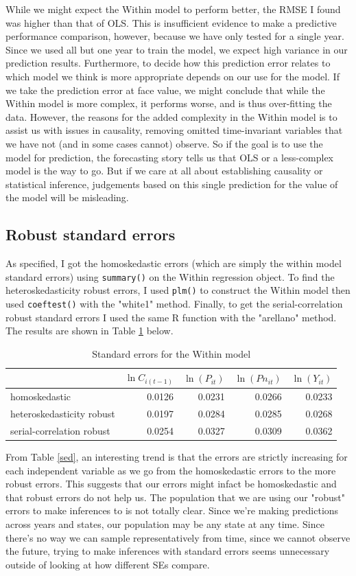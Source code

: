 \documentclass{article}
\begin{document}
While we might expect the Within model to perform better, the RMSE I found was higher than that of OLS. This is insufficient evidence to make a predictive performance comparison, however, because we have only tested for a single year. Since we used all but one year to train the model, we expect high variance in our prediction results. Furthermore, to decide how this prediction error relates to which model we think is more appropriate depends on our use for the model. If we take the prediction error at face value, we might conclude that while the Within model is more complex, it performs worse, and is thus over-fitting the data. However, the reasons for the added complexity in the Within model is to assist us with issues in causality, removing omitted time-invariant variables that we have not (and in some cases cannot) observe. So if the goal is to use the model for prediction, the forecasting story tells us that OLS or a less-complex model is the way to go. But if we care at all about establishing causality or statistical inference, judgements based on this single prediction for the value of the model will be misleading.

\subsection{Robust standard errors}
As specified, I got the homoskedastic errors (which are simply the within model standard errors) using \verb|summary()| on the Within regression object. To find the heteroskedasticity robust errors, I used \verb|plm()| to construct the Within model then used \verb|coeftest()| with the "white1" method. Finally, to get the serial-correlation robust standard errors I used the same R function with the "arellano" method. The results are shown in Table \ref{ses} below.
\begin{table}[H]
\centering
\caption{Standard errors for the Within model}
\label{ses}
\begin{tabular}{@{} l r r r r @{}}
 & $\ln C_{i(t-1)}$ & $\ln(P_{it})$ & $\ln(Pn_{it})$ & $\ln(Y_{it})$  \\\midrule
homoskedastic & 0.0126 & 0.0231 & 0.0266 & 0.0233 \\
heteroskedasticity robust & 0.0197 & 0.0284 & 0.0285 & 0.0268 \\
serial-correlation robust & 0.0254& 0.0327 & 0.0309& 0.0362  \\
\bottomrule
\hline
\end{tabular}
\end{table}

From Table \ref{sed}, an interesting trend is that the errors are strictly increasing for each independent variable as we go from the homoskedastic errors to the more robust errors. This suggests that our errors might infact be homoskedastic and that robust errors do not help us. The population that we are using our "robust" errors to make inferences to is not totally clear. Since we're making predictions across years and states, our population may be any state at any time. Since there's no way we can sample representatively from time, since we cannot observe the future, trying to make inferences with standard errors seems unnecessary outside of looking at how different SEs compare.
\end{document}
